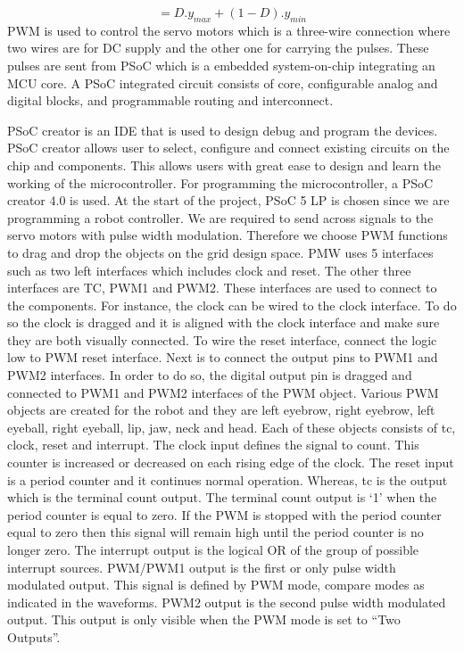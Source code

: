 \documentclass[letterpaper,12pt]{article}
\begin{document}
\begin{multicols}{2}
\begin{equation}
= D.y_{max} + (1-D).y_{min}
\end{equation}
PWM is used to control the servo motors which is a three-wire connection where two wires are for DC supply and the other one for carrying the pulses. These pulses are sent from PSoC which is a embedded system-on-chip integrating an MCU core. A PSoC integrated circuit consists of core, configurable analog and digital blocks, and programmable routing and interconnect.\\
\par
PSoC creator is an IDE that is used to design debug and program the devices. PSoC creator allows user to select, configure and connect existing circuits on the chip and components. This allows users with great ease to design and learn the working of the microcontroller. For programming the microcontroller, a PSoC creator 4.0 is used. At the start of the project, PSoC 5 LP is chosen since we are programming a robot controller. We are required to send across signals to the servo motors with pulse width modulation. Therefore we choose PWM functions to drag and drop the objects on the grid design space. PMW uses 5 interfaces such as two left interfaces which includes clock and reset. The other three interfaces are TC, PWM1 and PWM2. These interfaces are used to connect to the components. For instance, the clock can be wired to the clock interface. To do so the clock is dragged and it is aligned with the clock interface and make sure they are both visually connected. To wire the reset interface, connect the logic low to PWM reset interface. Next is to connect the output pins to PWM1 and PWM2 interfaces. In order to do so, the digital output pin is dragged and connected to PWM1 and PWM2 interfaces of the PWM object. Various PWM objects are created for the robot and they are left eyebrow, right eyebrow, left eyeball, right eyeball, lip, jaw, neck and head. Each of these objects consists of tc, clock, reset and interrupt. The clock input defines the signal to count. This counter is increased or decreased on each rising edge of the clock. The reset input is a period counter and it continues normal operation. Whereas, tc is the output which is the terminal count output. The terminal count output is `1' when the period counter is equal to zero. If the PWM is stopped with the period counter equal to zero then this signal will remain high until the period counter is no longer zero. The interrupt output is the logical OR of the group of possible interrupt sources. PWM/PWM1 output is the first or only pulse width modulated output. This signal is defined by PWM mode, compare modes as indicated in the waveforms. PWM2 output is the second pulse width modulated output. This output is only visible when the PWM mode is set to ``Two Outputs''.\\

\end{multicols}
\end{document}
